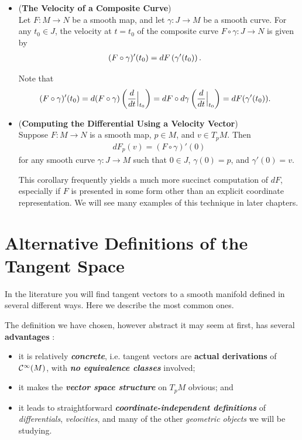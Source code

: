 \documentclass[11pt]{article}
\begin{document}
\begin{itemize}
\item \begin{proposition} (\textbf{The Velocity of a Composite Curve}) \citep{lee2003introduction}\\
 Let $F: M \rightarrow N$ be a smooth map, and let $\gamma: J \rightarrow M$ be a smooth curve. For any $t_0 \in J$, the velocity at $t = t_0$ of the composite curve $F \circ \gamma: J \rightarrow N$ is given by
\begin{align}
(F\circ \gamma)'(t_0) &= dF\left(\gamma'(t_0)\right). \label{eqn: curve_composite}
\end{align}
\end{proposition}
Note that
\begin{align*}
(F\circ \gamma)'(t_0) &= d(F\circ \gamma)\left(\frac{d}{dt}\Bigr|_{t_0}\right) = dF \circ d\gamma\left(\frac{d}{dt}\Bigr|_{t_0}\right) =dF(\gamma'(t_0)). 
\end{align*}

\item \begin{corollary} (\textbf{Computing the Differential Using a Velocity Vector}) \citep{lee2003introduction} \\
Suppose $F: M \rightarrow N$ is a smooth map, $p \in M$, and $v \in T_{p}M$. Then
\begin{align}
dF_{p}(v) = (F \circ \gamma)'(0) \label{eqn: differential_via_curve}
\end{align} for any smooth curve $\gamma: J \rightarrow M$ such that $0 \in J$, $\gamma(0) = p$, and $\gamma'(0) = v$.
\end{corollary} This corollary frequently yields a much more succinct computation of $dF$, especially if $F$ is presented in some form other than an explicit coordinate representation. We will see many examples of this technique in later chapters.
\end{itemize}

\section{Alternative Definitions of the Tangent Space}
In the literature you will find tangent vectors to a smooth manifold defined in several different ways. Here we describe the most common ones.

\begin{remark}
The definition we have chosen, however abstract it may seem at first, has several \textbf{advantages}  \citep{lee2003introduction}:
\begin{itemize}
\item it is relatively \emph{\textbf{concrete}}, i.e. tangent vectors are \textbf{actual derivations} of ${\mathcal C}^{\infty}(M)$, with \emph{\textbf{no equivalence classes}} involved;
\item it makes the \emph{\textbf{vector space structure}} on $T_{p}M$ obvious; and
\item it leads to straightforward \emph{\textbf{coordinate-independent definitions}} of \emph{differentials}, \emph{velocities}, and many of the other \emph{geometric objects} we will be studying.
\end{itemize}
\end{remark}
\end{document}
